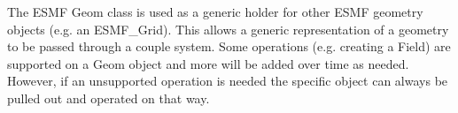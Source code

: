 %

The ESMF Geom class is used as a generic holder for other ESMF geometry objects (e.g. an ESMF_Grid). This allows a generic
representation of a geometry to be passed through a couple system. Some operations (e.g. creating a Field) are supported on
a Geom object and more will be added over time as needed. However, if an unsupported operation is needed the specific object
can always be pulled out and operated on that way.

